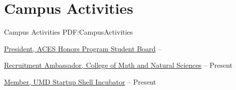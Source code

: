 
\section
{Campus Activities}
{Campus Activities}
{PDF:CampusActivities}

\BulletItem
\href{http://aces.umd.edu/}
{President,
ACES Honors Program Student Board}
\hfill
{} --

\GapNoBreak
\BulletItem
\href{https://cmns.umd.edu/undergraduate/admissions/recruitment-ambassadors}
{Recruitment Ambassador,
College of Math and Natural Sciences}
\hfill
{} --
Present

\GapNoBreak
\BulletItem
\href{http://startupshell.org/}
{Member,
UMD Startup Shell Incubator}
\hfill
{} --
Present
\GapNoBreak

